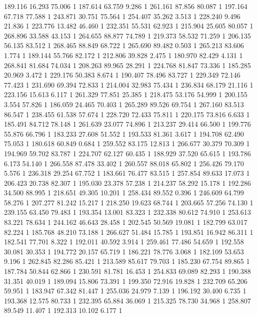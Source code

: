 	189.116	16.293	75.006	1
	187.614	63.759	9.286	1
	261.161	87.856	80.087	1
	197.164	67.718	77.588	1
	243.871	30.751	75.564	1
	254.407	35.262	3.513	1
	228.240	9.496	21.836	1
	223.776	13.482	46.460	1
	232.351	55.531	62.923	1
	215.904	25.605	80.057	1
	268.896	33.588	43.153	1
	264.655	88.877	74.789	1
	219.373	58.532	71.259	1
	206.135	56.135	83.512	1
	268.465	88.849	68.722	1
	265.690	89.482	0.503	1
	265.213	83.606	1.774	1
	189.144	55.766	82.172	1
	212.806	39.828	2.475	1
	180.970	82.429	4.131	1
	268.841	81.684	74.034	1
	208.263	89.965	28.291	1
	224.768	81.847	73.336	1
	185.285	20.969	3.472	1
	229.176	50.383	8.674	1
	190.407	78.496	83.727	1
	229.349	72.146	77.423	1
	231.690	69.394	72.833	1
	214.004	32.983	75.434	1
	236.834	68.179	21.116	1
	223.156	15.613	6.117	1
	261.329	77.851	25.385	1
	218.475	53.176	54.999	1
	200.155	3.554	57.826	1
	186.059	24.465	70.403	1
	265.289	89.526	69.754	1
	267.160	83.513	86.547	1
	238.455	61.538	57.674	1
	228.720	72.433	75.811	1
	220.175	73.816	6.633	1
	185.491	84.712	78.148	1
	261.639	23.077	74.896	1
	213.237	29.414	66.500	1
	199.776	55.876	66.796	1
	183.233	27.608	51.552	1
	193.533	81.361	3.617	1
	194.708	62.490	75.053	1
	180.618	60.849	0.684	1
	259.552	83.175	12.813	1
	266.677	30.379	70.309	1
	194.969	59.702	83.787	1
	224.707	62.127	60.435	1
	188.929	37.520	65.615	1
	193.786	6.173	54.140	1
	266.558	87.478	33.402	1
	260.557	88.018	65.802	1
	256.426	79.170	5.576	1
	236.318	29.254	67.752	1
	183.661	76.477	83.515	1
	257.854	89.633	17.073	1
	206.423	20.738	82.307	1
	195.030	23.378	57.238	1
	214.237	58.292	15.178	1
	192.286	34.500	88.995	1
	218.651	49.305	10.201	1
	258.434	89.552	0.396	1
	246.609	64.799	58.276	1
	207.277	81.242	15.217	1
	218.250	19.623	68.744	1
	203.665	57.256	74.130	1
	239.155	63.450	79.483	1
	193.354	13.001	83.323	1
	232.338	80.612	74.910	1
	253.613	83.221	78.634	1
	244.162	46.643	28.458	1
	202.545	50.569	19.081	1
	182.799	63.017	82.224	1
	185.768	48.210	73.188	1
	266.627	51.484	15.785	1
	193.851	16.942	86.311	1
	182.541	77.701	8.322	1
	192.011	40.592	3.914	1
	259.461	77.486	54.659	1
	192.558	30.081	30.353	1
	194.772	20.157	65.719	1
	186.221	78.776	3.068	1
	182.109	53.653	9.196	1
	262.845	82.286	85.421	1
	213.589	85.617	79.703	1
	185.230	67.754	89.865	1
	187.784	50.844	62.866	1
	230.591	81.781	16.453	1
	254.833	69.089	82.293	1
	190.388	31.351	40.019	1
	189.094	15.806	73.391	1
	199.350	72.916	19.828	1
	232.709	65.206	59.951	1
	183.947	67.342	81.447	1
	255.036	24.979	7.139	1
	196.192	30.400	6.735	1
	193.368	12.575	80.733	1
	232.395	65.884	36.069	1
	215.325	78.730	34.968	1
	258.807	89.549	11.407	1
	192.313	10.102	6.177	1
